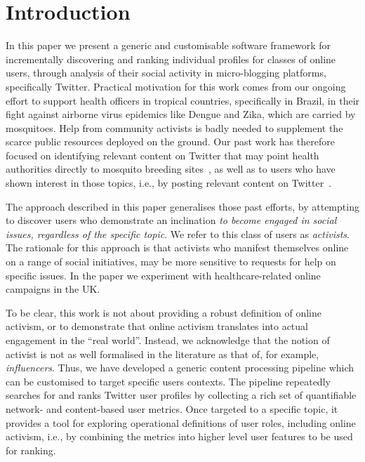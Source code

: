 \section{Introduction}

In this paper we present a generic and customisable software framework for incrementally discovering and ranking individual profiles for classes of online users, through analysis of their social activity in micro-blogging platforms, specifically Twitter.
Practical motivation for this work comes from our ongoing effort to support health officers in tropical countries, specifically in Brazil, in their fight against airborne virus epidemics like Dengue and Zika, which are carried by mosquitoes. Help from community activists is badly needed to supplement the scarce public resources deployed on the ground. Our past work has therefore focused on identifying relevant content on Twitter that may point health authorities directly to mosquito breeding sites~\cite{Sousa2018}, as well as to users who have shown interest in those topics, i.e., by posting relevant content on Twitter~\cite{Missier2017}. 

The approach described in this paper generalises those past efforts, by attempting to discover users who demonstrate an inclination \textit{to become engaged in social issues, regardless of the specific topic}.
We refer to this class of users as \textit{activists}.
The rationale for this approach is that activists who manifest themselves online on a range of social initiatives, may be more sensitive to requests for help on specific issues. 
In the paper we experiment with healthcare-related online campaigns in the UK.

To be clear, this work is not about providing a robust definition of online activism, or to demonstrate that online activism translates into actual engagement in the ``real world''.
%
Instead, we acknowledge that the notion of activist is not as well formalised in the literature as that of, for example, \textit{influencers}. 
Thus, we have developed a generic content processing pipeline which can be customised to target specific users contexts. 
The pipeline repeatedly searches for and ranks Twitter user profiles by collecting a rich set of quantifiable network- and content-based user metrics. 
Once targeted to a specific topic, it provides a tool for exploring operational definitions of user roles, including online activism, i.e., by combining the metrics into higher level user features to be used for ranking.

